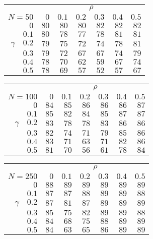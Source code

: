 \begin{tabular}{r|rrrrrr}
\hline\hline
 &\multicolumn{6}{c}{$\rho$} \\ 
 $N = 50$ & $0$ & $0.1$ & $0.2$ & $0.3$ & $0.4$ & $0.5$ \\ 
 \hline$0$ & $80$ & $80$ & $80$ & $82$ & $82$ & $82$\\ 
$0.1$ & $80$ & $78$ & $77$ & $78$ & $81$ & $81$\\ 
$\gamma\quad$$0.2$ & $79$ & $75$ & $72$ & $74$ & $78$ & $81$\\ 
$0.3$ & $79$ & $72$ & $67$ & $67$ & $74$ & $79$\\ 
$0.4$ & $78$ & $70$ & $62$ & $59$ & $67$ & $74$\\ 
$0.5$ & $78$ & $69$ & $57$ & $52$ & $57$ & $67$\\ 
 \hline 
 \end{tabular}
 
 \vspace{2em} 
 
\begin{tabular}{r|rrrrrr}
\hline\hline
 &\multicolumn{6}{c}{$\rho$} \\ 
 $N = 100$ & $0$ & $0.1$ & $0.2$ & $0.3$ & $0.4$ & $0.5$ \\ 
 \hline$0$ & $84$ & $85$ & $86$ & $86$ & $86$ & $87$\\ 
$0.1$ & $85$ & $82$ & $84$ & $85$ & $87$ & $87$\\ 
$\gamma\quad$$0.2$ & $83$ & $78$ & $78$ & $83$ & $86$ & $86$\\ 
$0.3$ & $82$ & $74$ & $71$ & $79$ & $85$ & $86$\\ 
$0.4$ & $83$ & $71$ & $63$ & $71$ & $82$ & $86$\\ 
$0.5$ & $81$ & $70$ & $56$ & $61$ & $78$ & $84$\\ 
 \hline 
 \end{tabular}
 
 \vspace{2em} 
 
\begin{tabular}{r|rrrrrr}
\hline\hline
 &\multicolumn{6}{c}{$\rho$} \\ 
 $N = 250$ & $0$ & $0.1$ & $0.2$ & $0.3$ & $0.4$ & $0.5$ \\ 
 \hline$0$ & $88$ & $89$ & $89$ & $89$ & $89$ & $89$\\ 
$0.1$ & $87$ & $87$ & $88$ & $89$ & $89$ & $88$\\ 
$\gamma\quad$$0.2$ & $87$ & $81$ & $87$ & $89$ & $89$ & $89$\\ 
$0.3$ & $85$ & $75$ & $82$ & $89$ & $89$ & $88$\\ 
$0.4$ & $84$ & $68$ & $75$ & $88$ & $89$ & $89$\\ 
$0.5$ & $84$ & $63$ & $65$ & $86$ & $89$ & $89$\\ 
 \hline 
 \end{tabular}